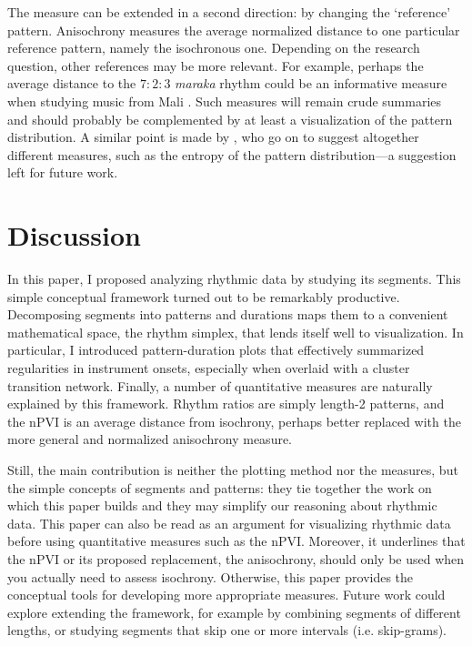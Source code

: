 \documentclass{tMAM2e}%
\theoremstyle{plain}
\theoremstyle{definition}
\theoremstyle{remark}
\begin{document}
The measure can be extended in a second direction: by changing the ‘reference’ pattern. 
Anisochrony measures the average normalized distance to one particular reference pattern, namely the isochronous one. 
Depending on the research question, other references may be more relevant. 
For example, perhaps the average distance to the $7 : 2 : 3$ \emph{maraka} rhythm could be an informative measure when studying music from Mali \citep[cf.][]{Jacoby2024NatHumBehav}.
Such measures will remain crude summaries and should probably be complemented by at least a visualization of the pattern distribution. 
A similar point is made by \citet{Jadoul2025Vibration}, who go on to suggest altogether different measures, such as the entropy of the pattern distribution—a suggestion left for future work. 


\section{Discussion}


In this paper, I proposed analyzing rhythmic data by studying its segments. 
This simple conceptual framework turned out to be remarkably productive. 
Decomposing segments into patterns and durations maps them to a convenient mathematical space, the rhythm simplex, that lends itself well to visualization. 
In particular, I introduced pattern-duration plots that effectively summarized regularities in instrument onsets, especially when overlaid with a cluster transition network. 
Finally, a number of quantitative measures are naturally explained by this framework. 
Rhythm ratios are simply length-2 patterns, and the nPVI is an average distance from isochrony, perhaps better replaced with the more general and normalized anisochrony measure. 

Still, the main contribution is neither the plotting method nor the measures, but the simple concepts of segments and patterns: they tie together the work on which this paper builds and they may simplify our reasoning about rhythmic data. 
This paper can also be read as an argument for visualizing rhythmic data before using quantitative measures such as the nPVI. 
Moreover, it underlines that the nPVI or its proposed replacement, the anisochrony, should only be used when you actually need to assess isochrony. 
Otherwise, this paper provides the conceptual tools for developing more appropriate measures. 
Future work could explore extending the framework, for example by combining segments of different lengths, or studying segments that skip one or more intervals (i.e. skip-grams). 
\end{document}
